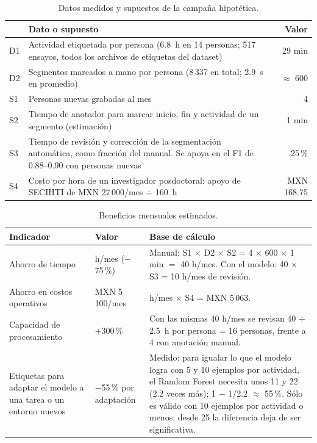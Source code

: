 \documentclass[letterpaper,11pt]{article}
\begin{document}
\begin{table}[H]
\centering
\small
\caption{Datos medidos y supuestos de la campaña hipotética.}
\begin{tabular}{@{}l>{\raggedright\arraybackslash}p{10.4cm}r@{}}
\toprule
& Dato o supuesto & Valor \\
\midrule
D1 & Actividad etiquetada por persona (6.8~h en 14 personas; 517 ensayos, todos los archivos de etiquetas del dataset) & 29 min \\
D2 & Segmentos marcados a mano por persona (8\,337 en total; 2.9~s en promedio) & $\approx$ 600 \\
S1 & Personas nuevas grabadas al mes & 4 \\
S2 & Tiempo de anotador para marcar inicio, fin y actividad de un segmento (estimación) & 1 min \\
S3 & Tiempo de revisión y corrección de la segmentación automática, como fracción del manual. Se apoya en el F1 de 0.88--0.90 con personas nuevas & 25\,\% \\
S4 & Costo por hora de un investigador posdoctoral: apoyo de SECIHTI de MXN 27\,000/mes \parencite{secihti2025epm} $\div$ 160~h & MXN 168.75 \\
\bottomrule
\end{tabular}
\end{table}

\begin{table}[H]
\centering
\small
\caption{Beneficios mensuales estimados.}
\begin{tabular}{@{}>{\raggedright\arraybackslash}p{3.6cm}>{\raggedright\arraybackslash}p{2.7cm}>{\raggedright\arraybackslash}p{8.3cm}@{}}
\toprule
Indicador & Valor & Base de cálculo \\
\midrule
Ahorro de tiempo & 30 h/mes ($-$75\,\%) & Manual: S1 $\times$ D2 $\times$ S2 = 4 $\times$ 600 $\times$ 1 min $=$ 40 h/mes. Con el modelo: 40 $\times$ S3 = 10 h/mes de revisión. \\
Ahorro en costos operativos & MXN 5\,100/mes & 30 h/mes $\times$ S4 = MXN 5\,063. \\
Capacidad de procesamiento & +300\,\% & Con las mismas 40 h/mes se revisan 40 $\div$ 2.5~h por persona = 16 personas, frente a 4 con anotación manual. \\
Etiquetas para adaptar el modelo a una tarea o un entorno nuevos & $-$55\,\% por adaptación & Medido: para igualar lo que el modelo logra con 5 y 10 ejemplos por actividad, el Random Forest necesita unos 11 y 22 (2.2 veces más); 1 $-$ 1/2.2 $\approx$ 55\,\%. Sólo es válido con 10 ejemplos por actividad o menos; desde 25 la diferencia deja de ser significativa. \\
\bottomrule
\end{tabular}
\end{table}
\end{document}
